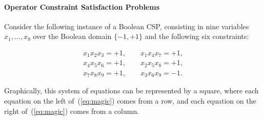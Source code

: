 \paragraph{Operator Constraint Satisfaction Problems}

Consider the following instance of a Boolean CSP, consisting in nine variables $x_1,\ldots,x_9$ over the Boolean domain $\{-1,+1\}$ and the following six
constraints:

\begin{equation}\label{eq:magic}
  \begin{split}
    x_1 x_2 x_3 = +1, \qquad x_1 x_4 x_7 = +1,\\
    x_4 x_5 x_6 = +1, \qquad x_2 x_5 x_8 = +1,\\
    x_7 x_8 x_9 = +1, \qquad x_3 x_6 x_9 = -1.
  \end{split}
\end{equation}

Graphically, this system of equations can be represented by a square, where each
equation on the left of~(\ref{eq:magic}) comes from a row, and each equation on the right
of~(\ref{eq:magic}) comes from a column.

